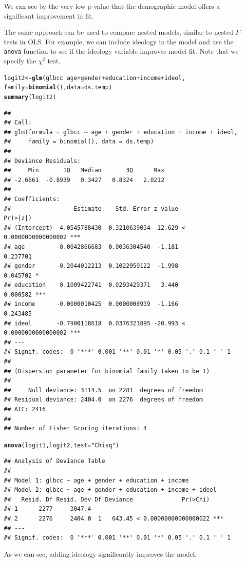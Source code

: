 \documentclass[11pt,openany]{book}\usepackage[]{graphicx}\usepackage[]{color}
\makeatletter
\newcommand{\hlstr}[1]{\textcolor[rgb]{0.192,0.494,0.8}{#1}}%
\newcommand{\hlopt}[1]{\textcolor[rgb]{0,0,0}{#1}}%
\newcommand{\hlstd}[1]{\textcolor[rgb]{0.345,0.345,0.345}{#1}}%
\newcommand{\hlkwb}[1]{\textcolor[rgb]{0.69,0.353,0.396}{#1}}%
\newcommand{\hlkwc}[1]{\textcolor[rgb]{0.333,0.667,0.333}{#1}}%
\newcommand{\hlkwd}[1]{\textcolor[rgb]{0.737,0.353,0.396}{\textbf{#1}}}%
\newenvironment{kframe}{%
 \def\at@end@of@kframe{}%
 \ifinner\ifhmode%
  \def\at@end@of@kframe{\end{minipage}}%
  \begin{minipage}{\columnwidth}%
 \fi\fi%
 \def\FrameCommand##1{\hskip\@totalleftmargin \hskip-\fboxsep
 \colorbox{shadecolor}{##1}\hskip-\fboxsep
     \hskip-\linewidth \hskip-\@totalleftmargin \hskip\columnwidth}%
 \MakeFramed {\advance\hsize-\width
   \@totalleftmargin\z@ \linewidth\hsize
   \@setminipage}}%
 {\par\unskip\endMakeFramed%
 \at@end@of@kframe}
\newenvironment{knitrout}{}{} %
\renewenvironment{knitrout}{\begin{singlespace}}{\end{singlespace}} %
\makeatother
\begin{document}
\noindent We can see by the very low p-value that the demographic model offers a significant improvement in fit. 

The same approach can be used to compare nested models, similar to nested $F$-tests in OLS. For example, we can include ideology in the model and use the \texttt{anova} function to see if the ideology variable improves model fit. Note that we specify the $\chi^2$ test. 
\begin{knitrout}
\color{fgcolor}\begin{kframe}
\begin{alltt}
\hlstd{logit2} \hlkwb{<-} \hlkwd{glm}\hlstd{(glbcc} \hlopt{~} \hlstd{age} \hlopt{+} \hlstd{gender} \hlopt{+} \hlstd{education} \hlopt{+} \hlstd{income} \hlopt{+} \hlstd{ideol,}
    \hlkwc{family} \hlstd{=} \hlkwd{binomial}\hlstd{(),} \hlkwc{data} \hlstd{= ds.temp)}
\hlkwd{summary}\hlstd{(logit2)}
\end{alltt}
\begin{verbatim}
## 
## Call:
## glm(formula = glbcc ~ age + gender + education + income + ideol, 
##     family = binomial(), data = ds.temp)
## 
## Deviance Residuals: 
##     Min       1Q   Median       3Q      Max  
## -2.6661  -0.8939   0.3427   0.8324   2.0212  
## 
## Coefficients:
##                  Estimate    Std. Error z value             Pr(>|z|)    
## (Intercept)  4.0545788430  0.3210639034  12.629 < 0.0000000000000002 ***
## age         -0.0042866683  0.0036304540  -1.181             0.237701    
## gender      -0.2044012213  0.1022959122  -1.998             0.045702 *  
## education    0.1009422741  0.0293429371   3.440             0.000582 ***
## income      -0.0000010425  0.0000008939  -1.166             0.243485    
## ideol       -0.7900118618  0.0376321895 -20.993 < 0.0000000000000002 ***
## ---
## Signif. codes:  0 '***' 0.001 '**' 0.01 '*' 0.05 '.' 0.1 ' ' 1
## 
## (Dispersion parameter for binomial family taken to be 1)
## 
##     Null deviance: 3114.5  on 2281  degrees of freedom
## Residual deviance: 2404.0  on 2276  degrees of freedom
## AIC: 2416
## 
## Number of Fisher Scoring iterations: 4
\end{verbatim}
\begin{alltt}
\hlkwd{anova}\hlstd{(logit1, logit2,} \hlkwc{test} \hlstd{=} \hlstr{"Chisq"}\hlstd{)}
\end{alltt}
\begin{verbatim}
## Analysis of Deviance Table
## 
## Model 1: glbcc ~ age + gender + education + income
## Model 2: glbcc ~ age + gender + education + income + ideol
##   Resid. Df Resid. Dev Df Deviance              Pr(>Chi)    
## 1      2277     3047.4                                      
## 2      2276     2404.0  1   643.45 < 0.00000000000000022 ***
## ---
## Signif. codes:  0 '***' 0.001 '**' 0.01 '*' 0.05 '.' 0.1 ' ' 1
\end{verbatim}
\end{kframe}
\end{knitrout}
\noindent As we can see, adding ideology significantly improves the model. 
\end{document}
